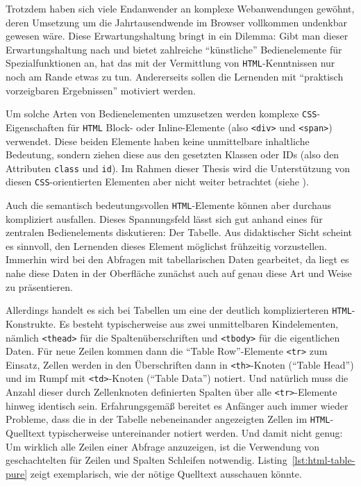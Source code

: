 Trotzdem haben sich viele Endanwender an komplexe Webanwendungen gewöhnt, deren Umsetzung um die Jahrtausendwende im Browser vollkommen undenkbar gewesen wäre. Diese Erwartungshaltung bringt \idename{} in ein Dilemma: Gibt man dieser Erwartungshaltung nach und bietet zahlreiche "`künstliche"' Bedienelemente für Spezialfunktionen an, hat das mit der Vermittlung von \texttt{HTML}-Kenntnissen nur noch am Rande etwas zu tun. Andererseits sollen die Lernenden mit "`praktisch vorzeigbaren Ergebnissen"' motiviert werden.

Um solche Arten von Bedienelementen umzusetzen werden komplexe \texttt{CSS}-Eigenschaften für \texttt{HTML} Block- oder Inline-Elemente (also \texttt{<div>} und \texttt{<span>}) verwendet. Diese beiden Elemente haben keine unmittelbare inhaltliche Bedeutung, sondern ziehen diese aus den gesetzten Klassen oder IDs (also den Attributen \texttt{class} und \texttt{id}). Im Rahmen dieser Thesis wird die Unterstützung von diesen \texttt{CSS}-orientierten Elementen aber nicht weiter betrachtet (siehe ).

Auch die semantisch bedeutungsvollen \texttt{HTML}-Elemente können aber durchaus kompliziert ausfallen. Dieses Spannungsfeld lässt sich gut anhand eines für \idename{} zentralen Bedienelements diskutieren: Der Tabelle. Aus didaktischer Sicht scheint es sinnvoll, den Lernenden dieses Element möglichst frühzeitig vorzustellen. Immerhin wird bei den Abfragen mit tabellarischen Daten gearbeitet, da liegt es nahe diese Daten in der Oberfläche zunächst auch auf genau diese Art und Weise zu präsentieren.

Allerdings handelt es sich bei Tabellen um eine der deutlich komplizierteren \texttt{HTML}-Konstrukte. Es besteht typischerweise aus zwei unmittelbaren Kindelementen, nämlich \texttt{<thead>} für die Spaltenüberschriften und \texttt{<tbody>} für die eigentlichen Daten. Für neue Zeilen kommen dann die "`Table Row"'-Elemente \texttt{<tr>} zum Einsatz, Zellen werden in den Überschriften dann in \texttt{<th>}-Knoten ("`Table Head"') und im Rumpf mit \texttt{<td>}-Knoten ("`Table Data"') notiert. Und natürlich muss die Anzahl dieser durch Zellenknoten definierten Spalten über alle \texttt{<tr>}-Elemente hinweg identisch sein. Erfahrungsgemäß bereitet es Anfänger auch immer wieder Probleme, dass die in der Tabelle nebeneinander angezeigten Zellen im \texttt{HTML}-Quelltext typischerweise untereinander notiert werden. Und damit nicht genug: Um wirklich alle Zeilen einer Abfrage anzuzeigen, ist die Verwendung von geschachtelten für Zeilen und Spalten Schleifen notwendig. Listing~\ref{lst:html-table-pure} zeigt exemplarisch, wie der nötige Quelltext ausschauen könnte.

